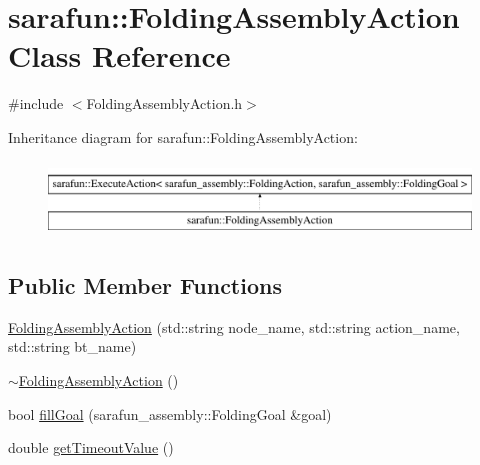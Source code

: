 \hypertarget{classsarafun_1_1FoldingAssemblyAction}{\section{sarafun\-:\-:Folding\-Assembly\-Action Class Reference}
\label{classsarafun_1_1FoldingAssemblyAction}
}


{\ttfamily \#include $<$Folding\-Assembly\-Action.\-h$>$}

Inheritance diagram for sarafun\-:\-:Folding\-Assembly\-Action\-:\begin{figure}[H]
\begin{center}
\leavevmode
\includegraphics[height=2.000000cm]{classsarafun_1_1FoldingAssemblyAction}
\end{center}
\end{figure}
\subsection*{Public Member Functions}
\begin{DoxyCompactItemize}
\item 
\hyperlink{classsarafun_1_1FoldingAssemblyAction_afc2da251f362a62c892f41d8e0bea0e5}{Folding\-Assembly\-Action} (std\-::string node\-\_\-name, std\-::string action\-\_\-name, std\-::string bt\-\_\-name)
\item 
\hyperlink{classsarafun_1_1FoldingAssemblyAction_a0e38e473ec7b9327dc0a4d32e11cc0d6}{$\sim$\-Folding\-Assembly\-Action} ()
\item 
bool \hyperlink{classsarafun_1_1FoldingAssemblyAction_a51597860319456f359d03c3e27c2fb96}{fill\-Goal} (sarafun\-\_\-assembly\-::\-Folding\-Goal \&goal)
\item 
double \hyperlink{classsarafun_1_1FoldingAssemblyAction_a14174e375aa1b8d5b63159f275b7d971}{get\-Timeout\-Value} ()
\end{DoxyCompactItemize}


